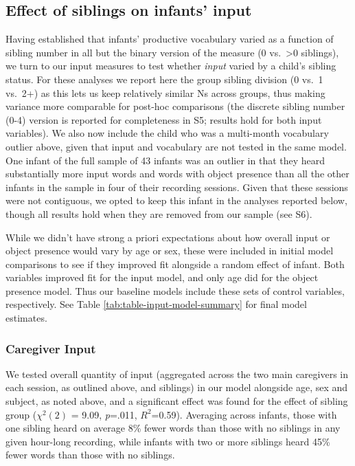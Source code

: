 \documentclass[
  man,floatsintext]{apa6}
\begin{document}
\hypertarget{effect-of-siblings-on-infants-input}{%
\subsection{Effect of siblings on infants' input}\label{effect-of-siblings-on-infants-input}}

Having established that infants' productive vocabulary varied as a function of sibling number in all but the binary version of the measure (0 vs.~\textgreater0 siblings), we turn to our input measures to test whether \emph{input} varied by a child's sibling status. For these analyses we report here the group sibling division (0 vs.~1 vs.~2+) as this lets us keep relatively similar Ns across groups, thus making variance more comparable for post-hoc comparisons (the discrete sibling number (0-4) version is reported for completeness in S5; results hold for both input variables). We also now include the child who was a multi-month vocabulary outlier above, given that input and vocabulary are not tested in the same model. One infant of the full sample of 43 infants was an outlier in that they heard substantially more input words and words with object presence than all the other infants in the sample in four of their recording sessions. Given that these sessions were not contiguous, we opted to keep this infant in the analyses reported below, though all results hold when they are removed from our sample (see S6).

While we didn't have strong a priori expectations about how overall input or object presence would vary by age or sex, these were included in initial model comparisons to see if they improved fit alongside a random effect of infant. Both variables improved fit for the input model, and only age did for the object presence model. Thus our baseline models include these sets of control variables, respectively. See Table \ref{tab:table-input-model-summary} for final model estimates.

\hypertarget{caregiver-input}{%
\subsubsection{Caregiver Input}\label{caregiver-input}}

We tested overall quantity of input (aggregated across the two main caregivers in each session, as outlined above, and siblings) in our model alongside age, sex and subject, as noted above, and a significant effect was found for the effect of sibling group (\(\chi^2 (2)\) = 9.09, \emph{p}=.011, \(R^2\)=0.59). Averaging across infants, those with one sibling heard on average 8\% fewer words than those with no siblings in any given hour-long recording, while infants with two or more siblings heard 45\% fewer words than those with no siblings.
\end{document}

